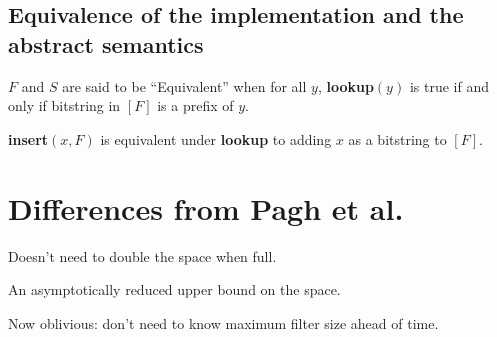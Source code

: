 \documentclass[11pt,letterpaper]{article}
\begin{document}






\subsection{Equivalence of the implementation and the abstract semantics}

$F$ and $S$ are said to be ``Equivalent'' when for all $y$, {\bf lookup$(y)$} is true if and only if bitstring in $[F]$ is a prefix of $y$.

{\bf insert$(x, F)$} is equivalent under {\bf lookup} to adding $x$ as a bitstring to $[F]$.


\section{Differences from Pagh et al.}

Doesn't need to double the space when full.

An asymptotically reduced upper bound on the space.

Now oblivious: don't need to know maximum filter size ahead of time.

{}

\end{document}
